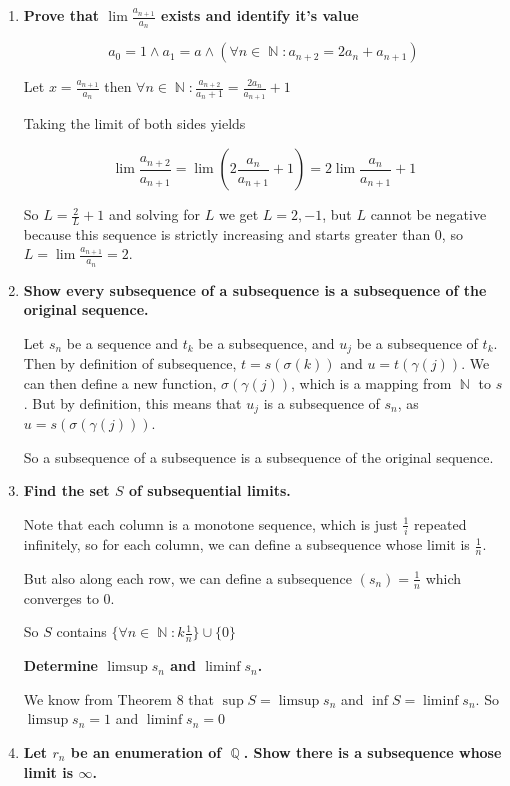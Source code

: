 \documentclass[10pt,a4paper]{article}
\DeclareMathOperator*{\Q}{\mathbb{Q}}
\DeclareMathOperator*{\N}{\mathbb{N}}
\begin{document}
\begin{enumerate}
    \item \textbf{Prove that $\lim \frac{a_{n+1}}{a_n}$ exists and identify it's value}

        $$a_0 = 1 \land a_1 =a \land (\forall n \in \N: a_{n+2} = 2a_n + a_{n+1})$$

        Let $x = \frac{a_{n+1}}{a_n}$ then $\forall n \in \N: \frac{a_{n+2}}{a_n+1} = \frac{2a_n}{a_{n+1}} + 1$

        Taking the limit of both sides yields 
        
        $$\lim \frac{a_{n+2}}{a_{n+1}} =  \lim \left( 2\frac{a_n}{a_{n+1}} + 1\right) = 2 \lim \frac{a_n}{a_{n+1}} + 1 $$

        So $L  = \frac{2}{L} +1$ and solving for $L$ we get $L = 2, -1$, but $L$ cannot be negative because this sequence is strictly increasing and starts greater than 0, so $L = \lim \frac{a_{n+1}}{a_n} = 2$.

    \item \textbf{Show every subsequence of a subsequence is a subsequence of the original sequence.}

        Let $s_n$ be a sequence and $t_k$ be a subsequence, and $u_j$ be a subsequence of $t_k$. Then by definition of subsequence, $t = s(\sigma(k))$ and $u = t(\gamma(j))$. We can then define a new function, $\sigma(\gamma(j))$, which is a mapping from $\N$ to $s$. But by definition, this means that $u_j$ is a subsequence of $s_n$, as $u = s(\sigma(\gamma(j)))$.

        So a subsequence of a subsequence is a subsequence of the original sequence.

    \item \textbf{Find the set $S$ of subsequential limits.}

        Note that each column is a monotone sequence, which is just $\frac{1}{i}$ repeated infinitely, so for each column, we can define a subsequence whose limit is $\frac{1}{n}$. 

        But also along each row, we can define a subsequence $(s_n) = \frac{1}{n}$ which converges to 0.

        So $S$ contains $\{ \forall n \in \N : k\frac{1}{n}\} \cup \{0 \}$

        \textbf{Determine $\limsup s_n$ and $\liminf s_n$.}

        We know from Theorem 8 that $\sup S = \limsup s_n$ and $\inf S = \liminf s_n$. So $\limsup s_n = 1 $ and $\liminf s_n = 0 $ 

    \item \textbf{Let $r_n$ be an enumeration of $\Q$. Show there is a subsequence whose limit is $\infty$.}


\end{enumerate}
\end{document}
